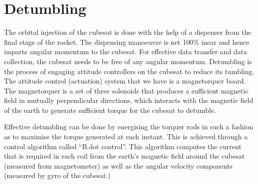 \chapter{Detumbling}

The orbital injection of the cubesat is done with the help of a dispenser  from the final stage of the rocket. The dispensing manoeuvre is net 100\% inear and hence imparts angular momentum to the cubesat. For effective data transfer and data collection, the cubesat needs to be free of any angular momentum. Detumbling is the process of engaging attitude controllers on the cubesat to reduce its tumbling. The attitude control (actuation) system that we have is a magnetorquer board. The magnetorquer is a set of three solenoids that produces a sufficient magnetic field in mutually perpendicular directions, which interacts with the magnetic field of the earth to generate sufficient torque for the cubesat to detumble.

\vspace{15pt}

Effective detumbling can be done by energising the torquer rods in such a fashion as to maximise the torque generated at each instant. This is achieved through a control algorithm called “B.dot control”. This algorithm computes the current that is required in each coil from the earth’s magnetic field around the cubesat (measured from magnetometer) as well as the angular velocity components (measured by gyro of the cubesat.)

\vspace{25pt}

 
